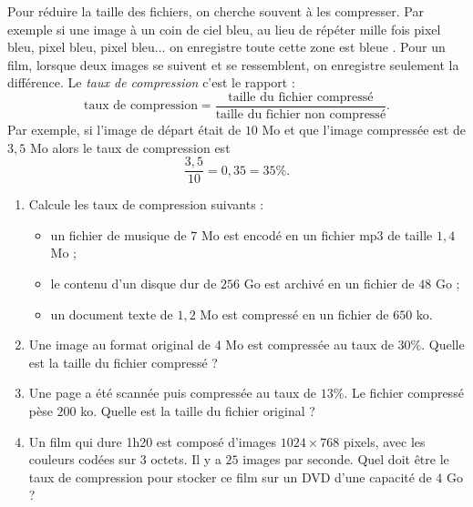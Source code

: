 \documentclass[class=report,crop=false, 12pt]{standalone}
\begin{document}
\begin{activite}
Pour réduire la taille des fichiers, on cherche souvent à les compresser.
Par exemple si une image à un coin de ciel bleu, au lieu de répéter mille fois \og pixel bleu, pixel bleu, pixel bleu... \fg{} on enregistre \og toute cette zone est bleue \fg{}. 
Pour un film, lorsque deux images se suivent et se ressemblent, on enregistre seulement la différence.
Le \emph{taux de compression} c'est le rapport :
$$\text{taux de compression} = \frac{\text{taille du fichier compressé}}{\text{taille du fichier non compressé}}.$$
Par exemple, si l'image de départ était de $10$ Mo et que l'image compressée est de $3,5$ Mo alors le taux de compression est 
$$\frac{3,5}{10} = 0,35 = 35 \%.$$

\begin{enumerate}
  \item Calcule les taux de compression suivants :
  \begin{itemize} 
    \item un fichier de musique de $7$ Mo est encodé en un fichier mp3 de taille $1,4$ Mo ;
  
    \item le contenu d'un disque dur de $256$ Go est archivé en un fichier de $48$ Go ;
        
    \item un document texte de $1,2$ Mo est compressé en un fichier de $650$ ko.
  \end{itemize}
  
  \item Une image au format original de $4$ Mo est compressée au taux de $30 \%$. Quelle est la taille du fichier compressé ?
  
  \item Une page a été scannée puis compressée au taux de $13 \%$. Le fichier compressé pèse $200$ ko. Quelle est la taille du fichier original ?
  
  \item  Un film qui dure 1h20 est composé d'images $1024 \times 768$ pixels, avec les couleurs codées sur $3$ octets. Il y a $25$ images par seconde. Quel doit être le taux de compression pour stocker ce film sur un DVD d'une capacité de $4$ Go ?
\end{enumerate}
\end{activite}
\end{document}
